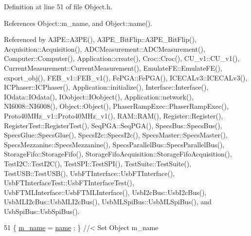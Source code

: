 Definition at line 51 of file Object.\+h.



References Object\+::m\+\_\+name, and Object\+::name().



Referenced by A3\+P\+E\+::\+A3\+P\+E(), A3\+P\+E\+\_\+\+Bit\+Flip\+::\+A3\+P\+E\+\_\+\+Bit\+Flip(), Acquisition\+::\+Acquisition(), A\+D\+C\+Measurement\+::\+A\+D\+C\+Measurement(), Computer\+::\+Computer(), Application\+::create(), Croc\+::\+Croc(), C\+U\+\_\+v1\+::\+C\+U\+\_\+v1(), Current\+Measurement\+::\+Current\+Measurement(), Emulate\+F\+E\+::\+Emulate\+F\+E(), export\+\_\+obj(), F\+E\+B\+\_\+v1\+::\+F\+E\+B\+\_\+v1(), Fe\+P\+G\+A\+::\+Fe\+P\+G\+A(), I\+C\+E\+C\+A\+Lv3\+::\+I\+C\+E\+C\+A\+Lv3(), I\+C\+Phaser\+::\+I\+C\+Phaser(), Application\+::initialize(), Interface\+::\+Interface(), I\+Odata\+::\+I\+Odata(), I\+Oobject\+::\+I\+Oobject(), Application\+::network(), N\+I6008\+::\+N\+I6008(), Object\+::\+Object(), Phaser\+Ramp\+Exec\+::\+Phaser\+Ramp\+Exec(), Proto40\+M\+Hz\+\_\+v1\+::\+Proto40\+M\+Hz\+\_\+v1(), R\+A\+M\+::\+R\+A\+M(), Register\+::\+Register(), Register\+Test\+::\+Register\+Test(), Seq\+P\+G\+A\+::\+Seq\+P\+G\+A(), Specs\+Bus\+::\+Specs\+Bus(), Specs\+Glue\+::\+Specs\+Glue(), Specs\+I2c\+::\+Specs\+I2c(), Specs\+Master\+::\+Specs\+Master(), Specs\+Mezzanine\+::\+Specs\+Mezzanine(), Specs\+Parallel\+Bus\+::\+Specs\+Parallel\+Bus(), Storage\+Fifo\+::\+Storage\+Fifo(), Storage\+Fifo\+Acquisition\+::\+Storage\+Fifo\+Acquisition(), Test\+I2\+C\+::\+Test\+I2\+C(), Test\+S\+P\+I\+::\+Test\+S\+P\+I(), Test\+Suite\+::\+Test\+Suite(), Test\+U\+S\+B\+::\+Test\+U\+S\+B(), Usb\+F\+T\+Interface\+::\+Usb\+F\+T\+Interface(), Usb\+F\+T\+Interface\+Test\+::\+Usb\+F\+T\+Interface\+Test(), Usb\+F\+T\+M\+L\+Interface\+::\+Usb\+F\+T\+M\+L\+Interface(), Usb\+I2c\+Bus\+::\+Usb\+I2c\+Bus(), Usb\+M\+L\+I2c\+Bus\+::\+Usb\+M\+L\+I2c\+Bus(), Usb\+M\+L\+Spi\+Bus\+::\+Usb\+M\+L\+Spi\+Bus(), and Usb\+Spi\+Bus\+::\+Usb\+Spi\+Bus().


\begin{DoxyCode}
51 \{ \hyperlink{classObject_a8b83c95c705d2c3ba0d081fe1710f48d}{m\_name}  = \hyperlink{classObject_a300f4c05dd468c7bb8b3c968868443c1}{name}  ; \} \textcolor{comment}{//< Set Object m\_name}
\end{DoxyCode}
\mbox{\label{classProcessus_a831b027b9cf18ab56fa6147b5d3055da}} 
